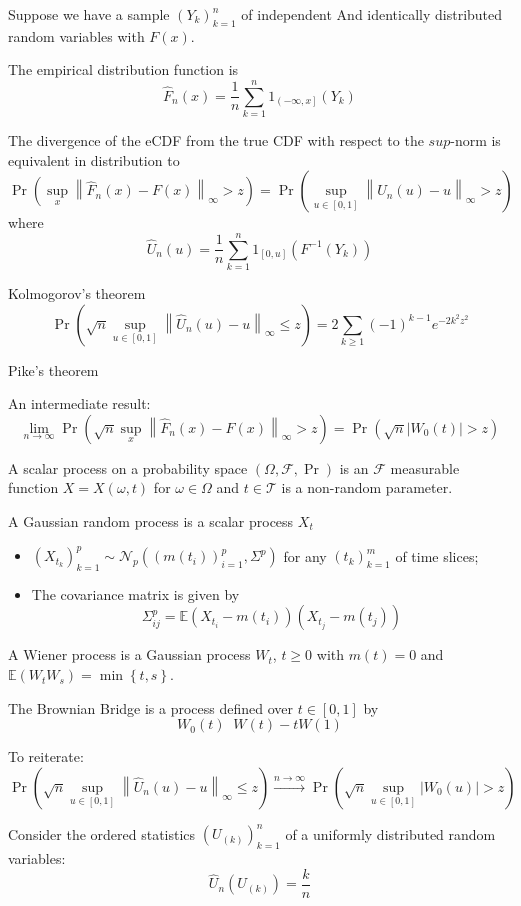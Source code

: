 \documentclass[a4paper]{article}
\newcommand{\obj}[1]{{\left\{ #1 \right \}}}
\newcommand{\clo}[1]{{\left [ #1 \right ]}}
\newcommand{\ploc}[1]{{\left ( #1 \right ]}}
\newcommand{\brac}[1]{{\left ( #1 \right )}}
\newcommand{\abs}[1]{{\left | #1 \right |}}
\newcommand{\nrm}[1]{{\left\| #1 \right \|}}
\newcommand{\Fcal}{\mathcal{F}}
\newcommand{\Tcal}{\mathcal{T}}
\newcommand{\Ncal}{\mathcal{N}}
\newcommand{\Ex}{\mathbb{E}}
\newcommand{\defn}{\mathop{\overset{\Delta}{=}}\nolimits}
\begin{document}
Suppose we have a sample  $\brac{Y_k}_{k=1}^n$ of independent And identically distributed random variables with $F(x)$.

The empirical distribution function is
\[\hat{F}_n(x) = \frac{1}{n}\sum_{k=1}^n 1_{\ploc{-\infty, x}}(Y_k)\]

The divergence of the eCDF from the true CDF with respect to the $
sup$-norm is equivalent in distribution to
\[\Pr\brac{\sup_{x}\nrm{\hat{F}_n(x) - F(x)}_\infty > z} = \Pr\brac{\sup_{u\in\clo{0,1}}\nrm{\hat{U}_n(u) - u}_\infty > z}\]
where 
\[\hat{U}_n(u) = \frac{1}{n}\sum_{k=1}^n 1_{\clo{0, u}}\brac{F^{-1}(Y_k)}\]

Kolmogorov's theorem
\[\Pr\brac{\sqrt{n} \sup_{u\in\clo{0,1}}\nrm{\hat{U}_n(u) - u}_\infty \leq z} = 2\sum_{k\geq1} {(-1)}^{k-1} e^{-2 k^2 z^2}\]


Pike's theorem


An intermediate result:
\[\lim_{n\to \infty} \Pr\brac{\sqrt{n} \sup_{x}\nrm{\hat{F}_n(x) - F(x)}_\infty > z} = \Pr\brac{\sqrt{n} \abs{W_0(t)} > z}\]

A scalar process on a probability space $\brac{\Omega, \Fcal, \Pr}$ is an $\Fcal$ measurable function $X = X(\omega, t)$ for $\omega\in \Omega$ and $t\in \Tcal$ is a non-random parameter.

A Gaussian random process is a scalar process $X_t$ \begin{itemize}
	\item $\brac{X_{t_k}}_{k=1}^p\sim \Ncal_p\brac{\brac{m(t_i)}_{i=1}^p, \Sigma^p}$ for any $\brac{t_k}_{k=1}^m$ of time slices;
	\item The covariance matrix is given by 
	\[\Sigma^p_{ij} = \Ex\brac{X_{t_i} - m(t_i)}\brac{X_{t_j} - m(t_j)}\]
\end{itemize}

A Wiener process is a Gaussian process $W_t$, $t\geq 0$ with $m(t) = 0$ and $\Ex\brac{W_t W_s} = \min\obj{t,s}$.

The Brownian Bridge is a process defined over $t\in\clo{0,1}$ by
\[W_0(t) \defn W(t) - t W(1)\]

To reiterate:
\[\Pr\brac{\sqrt{n} \sup_{u\in\clo{0,1}} \nrm{\hat{U}_n(u) - u}_\infty \leq z} \overset{n\to\infty}{\to} \Pr\brac{\sqrt{n} \sup_{u\in \clo{0,1}}\abs{W_0(u)} > z}\]

Consider the ordered statistics $\brac{U_{(k)}}_{k=1}^n$ of a uniformly distributed random variables:
\[\hat{U}_n(U_{(k)}) = \frac{k}{n}\]
\end{document}
